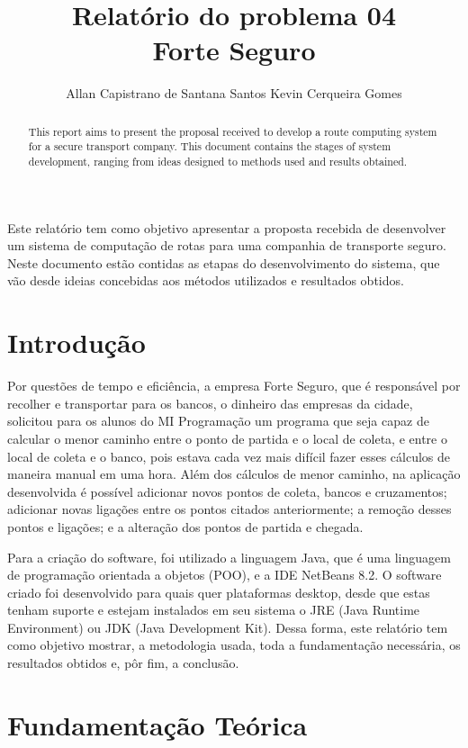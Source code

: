 \documentclass[12pt]{article}
\title{Relatório do problema 04\\ Forte Seguro}
\author{Allan Capistrano de Santana Santos\inst{1} Kevin Cerqueira Gomes\inst{2}}
\begin{document}
 

\maketitle

\begin{abstract}
  This report aims to present the proposal received to develop a route computing system for a secure transport company. This document contains the stages of system development, ranging from ideas designed to methods used and results obtained.
\end{abstract}
     
\begin{resumo} 
  Este relatório tem como objetivo apresentar a proposta recebida de desenvolver um sistema de computação de rotas para uma companhia de transporte seguro. Neste documento estão contidas as etapas do desenvolvimento do sistema, que vão desde ideias concebidas aos métodos utilizados e resultados obtidos.
\end{resumo}


\section{Introdução}
Por questões de tempo e eficiência, a empresa Forte Seguro, que é responsável por recolher e transportar para os bancos, o dinheiro das empresas da cidade, solicitou para os alunos do MI Programação um programa que seja capaz de calcular o menor caminho entre o ponto de partida e o local de coleta, e entre o local de coleta e o banco, pois estava cada vez mais difícil fazer esses cálculos de maneira manual em uma hora. Além dos cálculos de menor caminho, na aplicação desenvolvida é possível adicionar novos pontos de coleta, bancos e cruzamentos; adicionar novas ligações entre os pontos citados anteriormente; a remoção desses pontos e ligações; e a alteração dos pontos de partida e chegada.

Para a criação do software, foi utilizado a linguagem Java, que é uma linguagem de programação orientada a objetos (POO), e a IDE NetBeans 8.2. O software criado foi desenvolvido para quais quer plataformas desktop, desde que estas tenham suporte e estejam instalados em seu sistema o JRE (Java Runtime Environment) ou JDK (Java Development Kit). Dessa forma, este relatório tem como objetivo mostrar, a metodologia usada, toda a fundamentação necessária, os resultados obtidos e, pôr fim, a conclusão.

\section{Fundamentação Teórica} \label{sec:firstpage}
\end{document}
